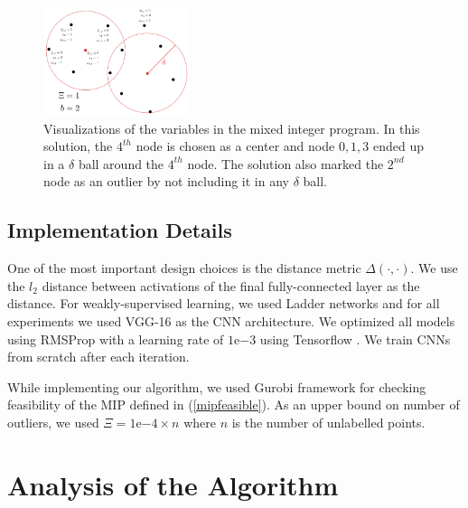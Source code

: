 \documentclass{article}
\begin{document}
\begin{figure}
\vspace{-5mm}
  \begin{center}
\includegraphics[width=0.38\textwidth]{mip.pdf}
\end{center}
    \caption{Visualizations of the variables in the mixed integer program. In this solution, the $4^{th}$ node is chosen as a center and node $0,1,3$ ended up in a $\delta$ ball around the $4^{th}$ node. The solution also marked the $2^{nd}$ node as an outlier by not including it in any $\delta$ ball.}
\label{mip}
\vspace{-12mm}
\end{figure}



\subsection{Implementation Details}
\label{sec:imp}
One of the most important design choices is the distance metric $\Delta(\cdot,\cdot)$. We use the $l_2$ distance between activations of the final fully-connected layer as the distance. For weakly-supervised learning, we used Ladder networks \cite{ladder} and for all experiments we used VGG-16 \cite{vgg} as the CNN architecture. We optimized all models using RMSProp with a learning rate of $1\mathrm{e}{-3}$ using Tensorflow \cite{tensorflow}. We train CNNs from scratch after each iteration. %

While implementing our algorithm, we used Gurobi \cite{gurobi} framework for checking feasibility of the MIP defined in (\ref{mipfeasible}). As an upper bound on number of outliers, we used $\Xi=1\mathrm{e}{-4} \times n$ where $n$ is the number of unlabelled points.

\section{Analysis of the Algorithm}
\label{sec:analysis}

\end{document}
